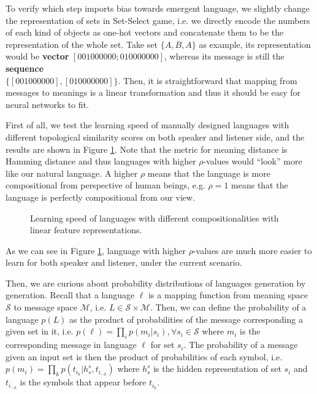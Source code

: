 To verify which step imports bias towards emergent language, we slightly change the representation of sets in Set-Select game, i.e. we directly encode the numbers of each kind of objects as one-hot vectors and concatenate them to be the representation of the whole set. Take set $\{A, B, A\}$ as example, its representation would be \textbf{vector} $[0 0 1 0 0 0 0 0 0; 0 1 0 0 0 0 0 0 0]$, whereas its message is still the \textbf{sequence} \\ $\{[0 0 1 0 0 0 0 0 0], [0 1 0 0 0 0 0 0 0]\}$. Then, it is straightforward that mapping from messages to meanings is a linear transformation and thus it should be easy for neural networks to fit. 

First of all, we test the learning speed of manually designed languages with different topological similarity scores on both speaker and listener side, and the results are shown in Figure \ref{fig4.5:learning_speed_joshua}. Note that the metric for meaning distance is Hamming distance and thus languages with higher $\rho$-values would ``look'' more like our natural language. A higher $\rho$ means that the language is more compositional from perspective of human beings, e.g. $\rho=1$ means that the language is perfectly compositional from our view.

\begin{figure}[!h]
    \centering
    \caption{Learning speed of languages with different compositionalities with linear feature representations.}
    \label{fig4.5:learning_speed_joshua}
\end{figure}

As we can see in Figure \ref{fig4.5:learning_speed_joshua}, language with higher $\rho$-values are much more easier to learn for both speaker and listener, under the current scenario.  

Then, we are curious about probability distributions of languages generation by generation. Recall that a language $\ell$ is a mapping function from meaning space $\mathcal{S}$ to message space $\mathcal{M}$, i.e. $L\in \mathcal{S} \times \mathcal{M}$. Then, we can define the probability of a language $p(L)$ as the product of probabilities of the message corresponding a given set in it, i.e. $p(\ell)=\prod_{i} p(m_i|s_i), \forall s_i\in \mathcal{S}$ where $m_i$ is the corresponding message in language $\ell$ for set $s_i$. The probability of a message given an input set is then the product of probabilities of each symbol, i.e. $p(m_i) = \prod_k p(t_{i_k}|h_s^s, t_{i_{-k}})$ where $h_s^s$ is the hidden representation of set $s_i$ and $t_{i_{-k}}$ is the symbols that appear before $t_{i_k}$.

